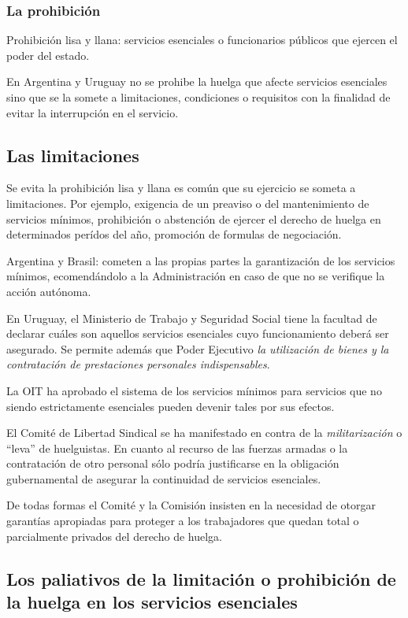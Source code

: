 \documentclass[spanish,12pt,a4paper,titlepage]{report}
\begin{document}
\subsubsection{La prohibición}


Prohibición lisa y llana: servicios esenciales o funcionarios públicos que ejercen el poder del estado. 

En Argentina y Uruguay no se prohibe la huelga que afecte servicios esenciales sino que se la somete a limitaciones, condiciones o requisitos con la finalidad de evitar la interrupción en el servicio.
\subsection{Las limitaciones}
Se evita la prohibición lisa y llana es común que su ejercicio se someta a limitaciones. Por ejemplo, exigencia de un preaviso o del mantenimiento de servicios mínimos, prohibición o abstención de ejercer el derecho de huelga en determinados perídos del año, promoción de formulas de negociación.

Argentina y Brasil: cometen a las propias partes la garantización de los servicios mínimos, ecomendándolo a la Administración en caso de que no se verifique la acción autónoma.

En Uruguay, el Ministerio de Trabajo y Seguridad Social tiene la facultad de declarar cuáles son aquellos servicios esenciales cuyo funcionamiento deberá ser asegurado. Se permite además que Poder Ejecutivo  \textit{la utilización de bienes y la contratación de prestaciones personales indispensables}.

La OIT ha aprobado el sistema de los servicios mínimos para servicios que no siendo estrictamente esenciales pueden devenir tales por sus efectos.

El Comité de Libertad Sindical se ha manifestado en contra de la \textit{militarización} o ``leva'' de huelguistas. En cuanto al recurso de las fuerzas armadas o la contratación de otro personal sólo podría justificarse en la obligación gubernamental de asegurar la continuidad de servicios esenciales. 

De todas formas el Comité y la Comisión insisten en la necesidad de otorgar garantías apropiadas para proteger a los trabajadores que quedan total o parcialmente privados del derecho de huelga.

\subsection{Los paliativos de la limitación o prohibición de la huelga en los servicios esenciales}
\end{document}
